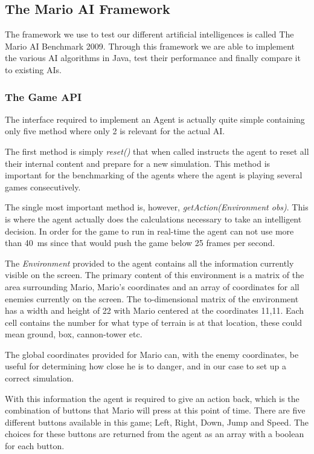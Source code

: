 \documentclass[10pt,a4paper]{article}
\renewcommand{\si}[1]{\SI{#1}}
\begin{document}
\subsection{The Mario AI Framework}
The framework we use to test our different artificial intelligences is called The Mario AI Benchmark 2009\cite{mario}. Through this framework we are able to implement the various AI algorithms in Java, test their performance and finally compare it to existing AIs.
\subsubsection{The Game API}
The interface required to implement an Agent is actually quite simple containing only five method where only 2 is relevant for the actual AI.

The first method is simply \emph{reset()} that when called instructs the agent to reset all their internal content and prepare for a new simulation. This method is important for the benchmarking of the agents where the agent is playing several games consecutively.

The single most important method is, however, \emph{getAction(Environment obs)}. This is where the agent actually does the calculations necessary to take an intelligent decision. In order for the game to run in real-time the agent can not use more than \si{40}{ms} since that would push the game below 25 frames per second.

The \emph{Environment} provided to the agent contains all the information currently visible on the screen. The primary content of this environment is a matrix of the area surrounding Mario, Mario's coordinates and an array of coordinates for all enemies currently on the screen. The to-dimensional matrix of the environment has a width and height of 22 with Mario centered at the coordinates 11,11. Each cell contains the number for what type of terrain is at that location, these could mean ground, box, cannon-tower etc.

The global coordinates provided for Mario can, with the enemy coordinates, be useful for determining how close he is to danger, and in our case to set up a correct simulation.

With this information the agent is required to give an action back, which is the combination of buttons that Mario will press at this point of time. There are five different buttons available in this game; Left, Right, Down, Jump and Speed. The choices for these buttons are returned from the agent as an array with a boolean for each button.
\end{document}
